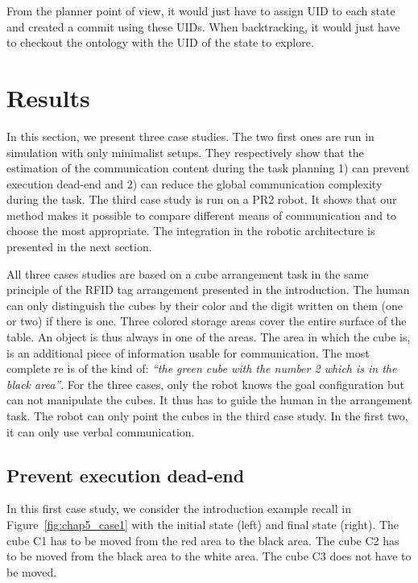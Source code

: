 From the planner point of view, it would just have to assign UID to each state and created a commit using these UIDs. When backtracking, it would just have to checkout the ontology with the UID of the state to explore.

\newpage

\section{Results}

In this section, we present three case studies. The two first ones are run in simulation with only minimalist setups. They respectively show that the estimation of the communication content during the task planning 1) can prevent execution dead-end and 2) can reduce the global communication complexity during the task. The third case study is run on a PR2 robot. It shows that our method makes it possible to compare different means of communication and to choose the most appropriate. The integration in the robotic architecture is presented in the next section.

All three cases studies are based on a cube arrangement task in the same principle of the RFID tag arrangement presented in the introduction. The human can only distinguish the cubes by their color and the digit written on them (one or two) if there is one. Three colored storage areas cover the entire surface of the table. An object is thus always in one of the areas. The area in which the cube is, is an additional piece of information usable for communication. The most complete \acrshort{re} is of the kind of: \textit{``the green cube with the number 2 which is in the black area''}. For the three cases, only the robot knows the goal configuration but can not manipulate the cubes. It thus has to guide the human in the arrangement task. The robot can only point the cubes in the third case study. In the first two, it can only use verbal communication.

\subsection{Prevent execution dead-end}

In this first case study, we consider the introduction example recall in Figure~\ref{fig:chap5_case1} with the initial state (left) and final state (right). The cube C1 has to be moved from the red area to the black area. The cube C2 has to be moved from the black area to the white area. The cube C3 does not have to be moved.

